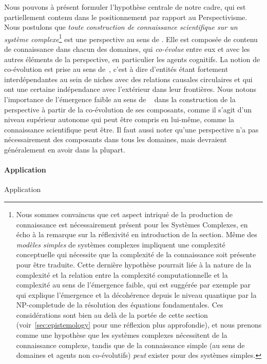 {Nous pouvons à présent formuler l'hypothèse centrale de notre cadre, qui est partiellement contenu dans le positionnement par rapport au Perspectivisme. Nous postulons que \emph{toute construction de connaissance scientifique sur un système complexe}\footnote{Nous sommes convaincus que cet aspect intriqué de la production de connaissance est nécessairement présent pour les Systèmes Complexes, en écho à la remarque sur la réflexivité en introduction de la section. Même des \emph{modèles simples} de systèmes complexes impliquent une complexité conceptuelle qui nécessite que la complexité de la connaissance soit présente pour être traduite. Cette dernière hypothèse pourrait liée à la nature de la complexité et la relation entre la complexité computationnelle et la complexité au sens de l'émergence faible, qui est suggérée par exemple par~\cite{2014arXiv1403.7686B} qui explique l'émergence et la décohérence depuis le niveau quantique par la NP-completude de la résolution des équations fondamentales. Ces considérations sont bien au delà de la portée de cette section (voir~\ref{sec:epistemology} pour une réflexion plus approfondie), et nous prenons comme une hypothèse que les systèmes complexes nécessitent de la connaissance complexe, tandis que de la connaissance simple (au sens de domaines et agents non co-évolutifs) \emph{peut} exister pour des systèmes simples.} est une perspective au sens de . Elle est composée de contenu de connaissance dans chacun des domaines, qui \emph{co-évolue} entre eux et avec les autres éléments de la perspective, en particulier les agents cognitifs. La notion de co-évolution est prise au sens de~\cite{holland2012signals}, c'est à dire d'entités étant fortement interdépendantes au sein de niches avec des relations causales circulaires et qui ont une certaine indépendance avec l'extérieur dans leur frontières. Nous notons l'importance de l'émergence faible au sens de ~\cite{bedau2002downward} dans la construction de la perspective à partir de la co-évolution de ses composants, comme il s'agit d'un niveau supérieur autonome qui peut être compris en lui-même, comme la connaissance scientifique peut être. Il faut aussi noter qu'une perspective n'a pas nécessairement des composants dans tous les domaines, mais devraient généralement en avoir dans la plupart.
}





\paragraph{Application}{Application}

